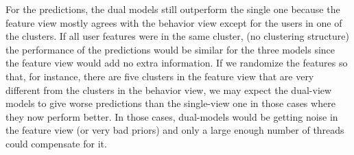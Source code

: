 \documentclass[smallextended]{svjour3}          %
\begin{document}
 
For the predictions, the dual models still outperform the single one because the feature view mostly agrees with the behavior view except for the users in one of the clusters. If all user features were in the same cluster, (no clustering structure) the performance of the predictions would be similar for the three models since the feature view would add no extra information. If we randomize the features so that, for instance, there are five clusters in the feature view that are very different from the clusters in the behavior view, we may expect the dual-view  models to give worse predictions than the single-view one in those cases where they now perform better. In those cases, dual-models would be getting noise in the feature view (or very bad priors) and only a large enough number of threads could compensate for it.
\end{document}
